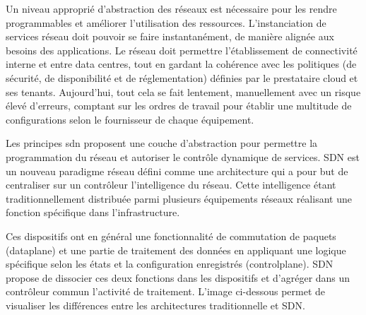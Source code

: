 Un niveau approprié  d'abstraction des réseaux est nécessaire pour les rendre programmables et améliorer l'utilisation des ressources. L’instanciation de services réseau doit pouvoir se faire instantanément, de manière alignée aux besoins des applications. Le réseau doit permettre l'établissement de connectivité interne et entre data centres, tout en gardant la cohérence avec les politiques (de sécurité, de disponibilité et de réglementation) définies par le prestataire cloud et ses tenants. Aujourd'hui, tout cela se fait lentement, manuellement avec un risque élevé d'erreurs, comptant sur les ordres de travail pour établir une  multitude  de configurations selon le fournisseur de chaque équipement.

Les principes \gls{sdn} %
proposent une couche d'abstraction pour permettre la programmation du réseau et autoriser le contrôle dynamique de services. SDN est un nouveau \gls{paradigme} réseau défini comme une architecture qui a pour but de centraliser  sur un contrôleur l'intelligence du réseau. Cette intelligence étant traditionnellement distribuée parmi plusieurs équipements réseaux réalisant une fonction spécifique dans l'infrastructure.

Ces dispositifs ont en général une fonctionnalité de commutation de paquets (\gls{dataplane}) et une partie de traitement des données en appliquant une logique spécifique selon les états et la configuration enregistrés (\gls{controlplane}). SDN propose de dissocier ces deux fonctions dans les dispositifs et d'agréger dans un contrôleur commun l'activité de traitement. L'image ci-dessous permet de visualiser les différences entre les architectures traditionnelle et SDN. \\


